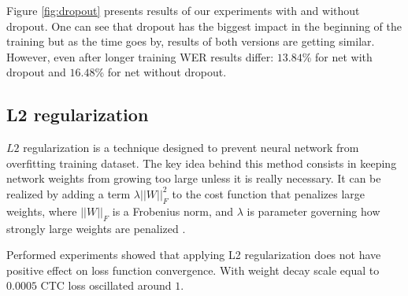 \documentclass[licencjacka,en]{pracamgr}
\begin{document}
	\noindent%
	\begin{minipage}{\linewidth}%
		\label{fig:dropout}		     
	\end{minipage}
	
	Figure \ref{fig:dropout} presents results of our experiments with and without dropout. One can see that dropout has the biggest impact in the beginning of the training but as the time goes by, results of both versions are getting similar. However, even after longer training WER results differ: $13.84$\% for net with dropout and $16.48$\% for net without dropout.
	
	
	\subsection{L2 regularization}
	$L2$ regularization is a technique designed to prevent neural network from overfitting training dataset. The key idea behind this method consists in keeping network weights from growing too large unless it is really necessary. It can be realized by adding a term $\lambda ||W||^2_F $ to the cost function that penalizes large weights, where $||W||_F $ is
	a Frobenius norm, and $\lambda$ is parameter governing how strongly large weights are penalized \cite{L2}.
	
	Performed experiments showed that applying L2 regularization does not have positive effect on loss function convergence. With weight decay scale equal to $0.0005$ CTC loss oscillated around $1$.
	
\end{document}
